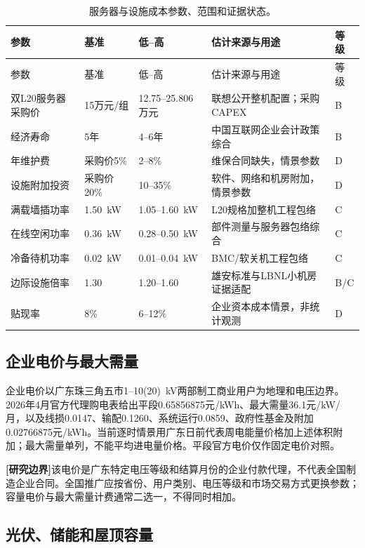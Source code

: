 \documentclass[preprint]{elsarticle}
\newcommand{\boundary}{\textcolor{black!65}{\textbf{[研究边界]}}}
\begin{document}
\begin{longtable}{p{3.5cm}p{2.3cm}p{2.4cm}p{4.2cm}p{1.2cm}}
 \caption{服务器与设施成本参数、范围和证据状态。}\label{tab:server-parameters}\\
 \toprule
 参数 & 基准 & 低--高 & 估计来源与用途 & 等级 \\
 \midrule
 \endfirsthead
 \toprule
 参数 & 基准 & 低--高 & 估计来源与用途 & 等级 \\
 \midrule
 \endhead
 双L20服务器采购价 & 15万元/组 & 12.75--25.806万元 & 联想公开整机配置；采购CAPEX & B \\
 经济寿命 & 5年 & 4--6年 & 中国互联网企业会计政策综合 & B \\
 年维护费 & 采购价5\% & 2--8\% & 维保合同缺失，情景参数 & D \\
 设施附加投资 & 采购价20\% & 10--35\% & 软件、网络和机房附加，情景参数 & D \\
 满载墙插功率 & 1.50~kW & 1.05--1.60~kW & L20规格加整机工程包络 & C \\
 在线空闲功率 & 0.36~kW & 0.28--0.50~kW & 部件测量与服务器包络综合 & C \\
 冷备待机功率 & 0.02~kW & 0.01--0.04~kW & BMC/软关机工程包络 & C \\
 边际设施倍率 & 1.30 & 1.20--1.60 & 雄安标准与LBNL小机房证据适配 & B/C \\
 贴现率 & 8\% & 6--12\% & 企业资本成本情景，非统计观测 & D \\
 \bottomrule
\end{longtable}

\subsection{企业电价与最大需量}

企业电价以广东珠三角五市1--10(20)~kV两部制工商业用户为地理和电压边界。2026年4月官方代理购电表给出平段0.65856875元/kWh、最大需量36.1元/kW/月，以及线损0.0147、输配0.1260、系统运行0.0859、政府性基金及附加0.02766875元/kWh\cite{gdTariff2026}。当前逐时情景用广东日前代表周电能量价格加上述体积附加；最大需量单列，不能平均进电量价格。平段官方电价仅作固定电价对照。

\boundary 该电价是广东特定电压等级和结算月份的企业付款代理，不代表全国制造企业合同。全国推广应按省份、用户类别、电压等级和市场交易方式更换参数；容量电价与最大需量计费通常二选一，不得同时相加。

\subsection{光伏、储能和屋顶容量}
\end{document}
